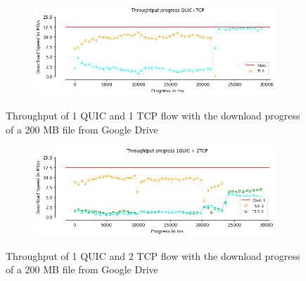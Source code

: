 \begin{frame}

\begin{figure}[!htb]
    \centering
    \begin{subfigure}{0.45\textwidth}
        \includegraphics[width=\linewidth]{./plots/PI/throughput/ThroughtputprogressQUIC+TCP.png}
    \end{subfigure}
    
    \caption{Throughput of 1 QUIC and 1 TCP flow with the download progress of a 200 MB file from Google Drive}\label{fig:throughput-of-2go}
\end{figure}

\begin{figure}[!htb]
    \centering
    \begin{subfigure}{0.45\textwidth}
        \includegraphics[width=\linewidth]{./plots/PI/throughput/Throughtputprogress1QUIC+2TCP.png}
    \end{subfigure}
    
    \caption{Throughput of 1 QUIC and 2 TCP flow with the download progress of a 200 MB file from Google Drive}\label{fig:throughput-of-c}
\end{figure}

\end{frame}
\clearpage

